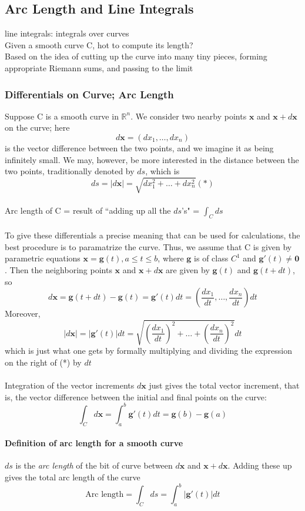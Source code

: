 \documentclass[11pt]{article}
\newcommand{\ti}[1]{\textit{#1}}
\newcommand{\tb}[1]{\textbf{#1}}
\newcommand{\real}[0]{\mathbb{R}}
\newcommand{\vx}[0]{\tb{x}}
\newcommand{\vo}[0]{\tb{0}}
\begin{document}
\subsection{Arc Length and Line Integrals}
line integrals: integrals over curves\\
Given a smooth curve C, hot to compute its length? \\
Based on the idea of cutting up the curve into many tiny pieces, forming appropriate Riemann sums, and passing to the limit
\subsubsection{Differentials on Curve; Arc Length} Suppose C is a smooth curve in $\real^n$. We consider two nearby points $\vx$ and $\vx + d\vx$ on the curve; here
$$d\vx = (dx_1,\hdots,dx_n)$$
is the vector difference between the two points, and we imagine it as being infinitely small. We may, however, be more interested in the distance between the two points, traditionally denoted by $ds$, which is $$ds = |d\vx| = \sqrt{dx^2_1+\hdots+dx^2_n}(*)$$\\
Arc length of C = result of ``adding up all the $ds$'s" = $\int_Cds$\\\\
To give these differentials a precise meaning that can be used for calculations, the best procedure is to paramatrize the curve. Thus, we assume that C is given by parametric equations $\vx = \tb{g}(t), a\leq t \leq b$, where $\tb{g}$ is of class $C^1$ and $\tb{g}'(t) \neq \vo$. Then the neighboring points $\vx$ and $\vx + d\vx$ are given by $\tb{g}(t)$ and $\tb{g}(t+dt)$, so $$d\vx = \tb{g}(t+dt) - \tb{g}(t) = \tb{g}'(t)dt = (\frac{dx_1}{dt},\hdots,\frac{dx_n}{dt})dt$$ Moreover,
$$|d\vx| = |\tb{g}'(t)|dt = \sqrt{(\frac{dx_1}{dt})^2+ \hdots + (\frac{dx_n}{dt})^2}dt$$which is just what one gets by formally multiplying and dividing the expression on the right of (*) by $dt$\\\\
Integration of the vector increments $d\vx$ just gives the total vector increment, that is, the vector difference between the initial and final points on the curve:
$$\int_C d\vx = \int_a^b \tb{g}'(t)dt = \tb{g}(b)-\tb{g}(a)$$
\paragraph{Definition of arc length for a smooth curve}
$ds$ is the \ti{arc length} of the bit of curve between $d\vx$ and $\vx + d\vx$. Adding these up gives the total arc length of the curve
$$\mbox{Arc length} = \int_C ds = \int_a^b|\tb{g}'(t)|dt$$
\end{document}
